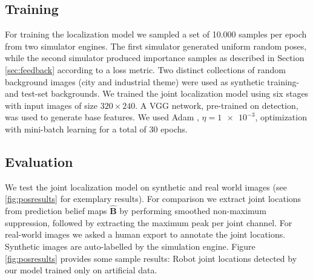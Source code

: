 \documentclass[conference]{IEEEtran}
\begin{document}
    \subsection{Training}
    For training the localization model we sampled a set of 10.000 samples per epoch from two simulator engines. The first simulator generated uniform random poses, while the second simulator produced importance samples as described in Section \ref{sec:feedback} according to a loss metric. Two distinct collections of random background images (city and industrial theme) were used as synthetic training- and test-set backgrounds. We trained the joint localization model using six stages with input images of size $320 \times 240$. A VGG network, pre-trained on detection, was used to generate base features. We used Adam \cite{kingma2014adam}, $\eta=\num{1e-3}$, optimization with mini-batch learning for a total of 30 epochs.

    \subsection{Evaluation}
    We test the joint localization model on synthetic and real world images (see \ref{fig:posresults} for exemplary results). For comparison we extract joint locations from prediction belief maps $\hat{\mathbf{B}}$ by performing smoothed non-maximum suppression, followed by extracting the maximum peak per joint channel. For real-world images we asked a human export to annotate the joint locations. Synthetic images are auto-labelled by the simulation engine. Figure \ref{fig:posresults} provides some sample results: Robot joint locations detected by our model trained only on artificial data.
    
\end{document}
